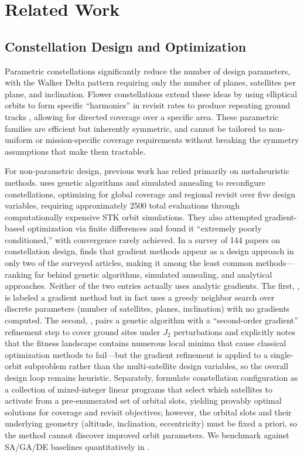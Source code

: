 \section{Related Work}
\label{sec:related_work}

\subsection{Constellation Design and Optimization}

Parametric constellations significantly reduce the number of design parameters, with the Walker Delta pattern \citep{walker_satellite_1984} requiring only the number of planes, satellites per plane, and inclination. Flower constellations extend these ideas by using elliptical orbits to form specific ``harmonics'' in revisit rates to produce repeating ground tracks \citep{mortari_flower_2004}, allowing for directed coverage over a specific area. These parametric families are efficient but inherently symmetric, and cannot be tailored to non-uniform or mission-specific coverage requirements without breaking the symmetry assumptions that make them tractable.

For non-parametric design, previous work has relied primarily on metaheuristic methods.
\citet{paek_optimization_2019} uses genetic algorithms and simulated annealing to reconfigure constellations, optimizing for global coverage and regional revisit over five design variables, requiring approximately 2500 total evaluations through computationally expensive STK orbit simulations.
They also attempted gradient-based optimization via finite differences and found it ``extremely poorly conditioned,'' with convergence rarely achieved.
In a survey of 144 papers on constellation design, \citet{choo_survey_2024} finds that gradient methods appear as a design approach in only two of the surveyed articles, making it among the least common methods---ranking far behind genetic algorithms, simulated annealing, and analytical approaches.
Neither of the two entries actually uses analytic gradients.
The first, \citet{fraire_sparse_2020}, is labeled a gradient method but in fact uses a greedy neighbor search over discrete parameters (number of satellites, planes, inclination) with no gradients computed.
The second, \citet{abdelkhalik_optimization_2011}, pairs a genetic algorithm with a ``second-order gradient'' refinement step to cover ground sites under $J_2$ perturbations and explicitly notes that the fitness landscape contains numerous local minima that cause classical optimization methods to fail---but the gradient refinement is applied to a single-orbit subproblem rather than the multi-satellite design variables, so the overall design loop remains heuristic.
Separately, \citet{williams_rogers_optimal_2026} formulate constellation configuration as a collection of mixed-integer linear programs that select which satellites to activate from a pre-enumerated set of orbital slots, yielding provably optimal solutions for coverage and revisit objectives; however, the orbital slots and their underlying geometry (altitude, inclination, eccentricity) must be fixed a priori, so the method cannot discover improved orbit parameters.
We benchmark against SA/GA/DE baselines quantitatively in .

